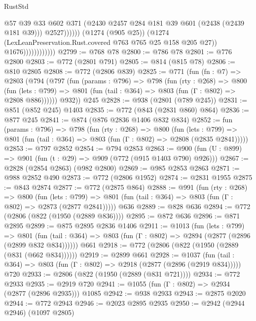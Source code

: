 \begin{lexlean}{RustStd}
\begin{coremodule}
                                        @57
                                        @39
                                        @33
                                        @602
                                        @371
                                        (@2430 @2457 @284 @181 @39 @601 (@2438 (@2439 @181 @39)))
                                        @2527))))))
                            (@1274 (@905 @25))
                            (@1274 (LexLeanPreservation.Rust.covered @763 @765 @25 @158 @205 @27))
                            @1676))))))))))))
@2799 := @768 @78
@2800 := @786 @78
@2801 := @776 @2800
@2803 := @772 (@2801 @791)
@2805 := @814 (@815 @78)
@2806 := @810 @2805
@2808 := @772 (@2806 @839)
@2825 := @771
    (fun (fn : @7) =>
    @2803
      (@794
        (@797
          (fun (params : @796) =>
          @798
            (fun (rty : @268) =>
            @800
              (fun (lets : @799) =>
              @801 (fun (tail : @364) => @803 (fun (Γ : @802) => @2808 @886))))))
        @932))
    @245
@2828 := @938 (@2801 (@789 @245))
@2831 := @851 (@852 @245) @1403
@2835 := @772 (@843 (@2831 @860) @864)
@2836 := @877 @245
@2841 := @874 (@876 @2836 @1406 @832 @834)
@2852 := fun (params : @796) =>
  @798
    (fun (rty : @268) =>
    @800
      (fun (lets : @799) =>
      @801 (fun (tail : @364) => @803 (fun (Γ : @802) => @2808 (@2835 @2841)))))
@2853 := @797 @2852
@2854 := @794 @2853
@2863 := @900 (fun (U : @899) => @901 (fun (t : @29) => @909 (@772 (@915 @1403 @790) @926)))
@2867 := @2828 (@2854 @2863) (@982 @2800)
@2869 := @985 @2853 @2863
@2871 := @988 @2852 @490
@2873 := @772 (@2806 @1952)
@2874 := @2831 @1955
@2875 := @843 @2874
@2877 := @772 (@2875 @864)
@2888 := @991
    (fun (rty : @268) =>
    @800
      (fun (lets : @799) =>
      @801 (fun (tail : @364) => @803 (fun (Γ : @802) => @2873 (@2877 @2841)))))
    @636
@2889 := @828 @636
@2894 := @772 (@2806 (@822 (@1950 (@2889 @836))))
@2895 := @872 @636
@2896 := @871 @2895
@2899 := @875 @2895 @2836 @1406
@2911 := @1013
    (fun (lets : @799) =>
    @801 (fun (tail : @364) => @803 (fun (Γ : @802) => @2894 (@2877 (@2896 (@2899 @832 @834))))))
    @661
@2918 := @772 (@2806 (@822 (@1950 (@2889 (@831 (@662 @834))))))
@2919 := @2899 @661
@2928 := @1037
    (fun (tail : @364) => @803 (fun (Γ : @802) => @2918 (@2877 (@2896 (@2919 @834)))))
    @720
@2933 := @2806 (@822 (@1950 (@2889 (@831 @721))))
@2934 := @772 @2933
@2935 := @2919 @720
@2941 := @1055 (fun (Γ : @802) => @2934 (@2877 (@2896 @2935))) @1085
@2942 := @938 @2933
@2943 := @2875 @2020
@2944 := @772 @2943
@2946 := @2023 @2895 @2935
@2950 := @2942 (@2944 @2946) (@1097 @2805)

\end{coremodule}
\end{lexlean}
